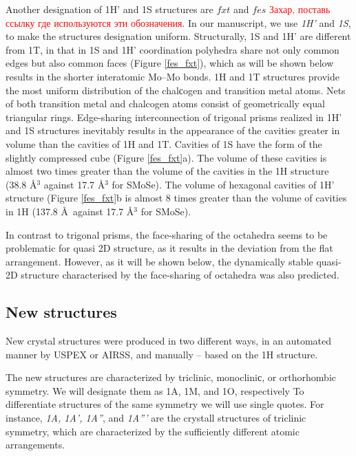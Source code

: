 \documentclass[a4paperm]{article}
\begin{document}
Another designation of 1H' and 1S structures are $fxt$ and $fes$ \cite{}\textcolor{red}{Захар, поставь ссылку где используются эти обозначения}.
In our manuscript, we use {\it 1H'} and {\it 1S}, to make the structures designation uniform.
Structurally, 1S and 1H' are different from 1T, in that in 1S and 1H' coordination polyhedra share not only common edges but also common faces (Figure \ref{fes_fxt}), which as will be shown below results in the shorter interatomic Mo--Mo bonds.
1H and 1T structures provide the most uniform distribution of the chalсogen and transition metal atoms.
Nets of both transition metal and chalcogen atoms consist of  geometrically equal triangular rings.
Edge-sharing interconnection of trigonal prisms realized in 1H' and 1S structures inevitably results in the appearance of the cavities greater in volume than the cavities of 1H and 1T. 
Cavities of 1S have the form of the slightly compressed cube (Figure \ref{fes_fxt}a).
The volume of these cavities is almost two times greater than the volume of the cavities in the 1H structure (38.8 \AA$^3$ against 17.7 \AA$^3$ for SMoSe).
The volume of hexagonal cavities of 1H' structure (Figure \ref{fes_fxt}b is almost 8 times greater than the volume of cavities in 1H (137.8 \AA\ against 17.7 \AA$^3$ for SMoSe).

In contrast to trigonal prisms, the face-sharing of the octahedra seems to be problematic for quasi 2D structure, as it results in the deviation from the flat arrangement.
However, as it will be shown below, the dynamically stable quasi-2D structure characterised by the face-sharing of octahedra was also predicted.



		\subsection{New structures}

New crystal structures were produced in two different ways, in an automated manner by USPEX or AIRSS, and manually -- based on the 1H structure.

The new structures are characterized by triclinic, monocliniс, or orthorhombic symmetry.
We will designate them as 1A, 1M, and 1O, respectively
To differentiate structures of the same symmetry we will use single quotes.
For instance, {\it 1A, 1A', 1A''}, and {\it 1A'''} are the crystall structures of triclinic symmetry, which are characterized by the sufficiently different atomic arrangements.
\end{document}

